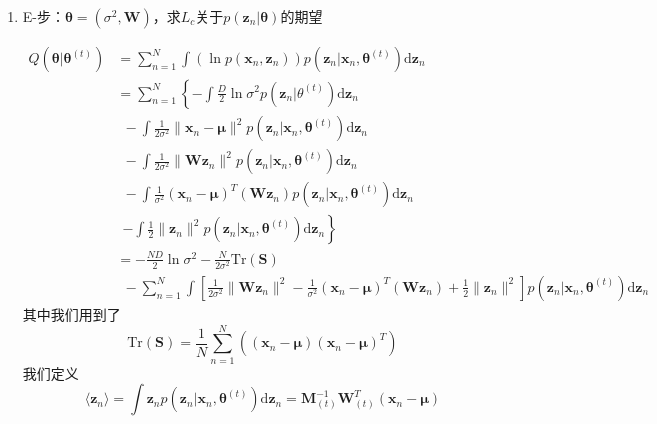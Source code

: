 \begin{enumerate}
	\item E-步：$\boldsymbol{\theta}=(\sigma^2,\boldsymbol{W})$，求$L_c$关于$p(\boldsymbol{z}_n|\boldsymbol{\theta})$的期望
	
	\begin{equation}
		\begin{aligned}
			Q(\boldsymbol{\theta}|\boldsymbol{\theta}^{(t)})&=\sum_{n=1}^{N}\int (\ln p(\boldsymbol{x}_n,\boldsymbol{z}_n))p(\boldsymbol{z}_n|\boldsymbol{x}_n,\boldsymbol{\theta}^{(t)})\mathrm{d}\boldsymbol{z}_n\\
			&=\sum_{n=1}^{N}\left\{-\int \frac{D}{2}\ln \sigma^2p(\boldsymbol{z}_n|\theta^{(t)})\mathrm{d}\boldsymbol{z}_n\right.\\
			&\ \ -\int \frac{1}{2\sigma^2}\lVert \boldsymbol{x}_n-\boldsymbol{\mu}\rVert^2p(\boldsymbol{z}_n|\boldsymbol{x}_n,\boldsymbol{\theta}^{(t)})\mathrm{d}\boldsymbol{z}_n\\
			&\ \ -\int \frac{1}{2\sigma^2}\lVert \boldsymbol{Wz}_n\rVert^2p(\boldsymbol{z}_n|\boldsymbol{x}_n,\boldsymbol{\theta}^{(t)})\mathrm{d}\boldsymbol{z}_n\\
			&\ \ -\int \frac{1}{\sigma^2}(\boldsymbol{x}_n-\boldsymbol{\mu})^T(\boldsymbol{Wz}_n)p(\boldsymbol{z}_n|\boldsymbol{x}_n,\boldsymbol{\theta}^{(t)})\mathrm{d}\boldsymbol{z}_n\\
			&\ \ \left.-\int \frac{1}{2}\lVert \boldsymbol{z}_n\rVert^2p(\boldsymbol{z}_n|\boldsymbol{x}_n,\boldsymbol{\theta}^{(t)})\mathrm{d}\boldsymbol{z}_n\right\}\\
			&=-\frac{ND}{2}\ln \sigma^2-\frac{N}{2\sigma^2}\mathrm{Tr}(\boldsymbol{S})\\
			&\ \ -\sum_{n=1}^{N}\int \left[\frac{1}{2\sigma^2}\lVert\boldsymbol{Wz}_n\rVert^2-\frac{1}{\sigma^2}(\boldsymbol{x}_n-\boldsymbol{\mu})^T(\boldsymbol{Wz}_n)+\frac{1}{2}\lVert\boldsymbol{z}_n\rVert^2 \right]p(\boldsymbol{z}_n|\boldsymbol{x}_n,\boldsymbol{\theta}^{(t)})\mathrm{d}\boldsymbol{z}_n
		\end{aligned}
	\end{equation}
	其中我们用到了
	\begin{equation}
		\mathrm{Tr}(\boldsymbol{S})=\frac{1}{N}\sum_{n=1}^{N}\left((\boldsymbol{x}_n-\boldsymbol{\mu})(\boldsymbol{x}_n-\boldsymbol{\mu})^T\right)
	\end{equation}
	我们定义
	\begin{equation}
		\langle\boldsymbol{z}_n\rangle=\int \boldsymbol{z}_np(\boldsymbol{z}_n|\boldsymbol{x}_n,\boldsymbol{\theta}^{(t)})\mathrm{d}\boldsymbol{z}_n=\boldsymbol{M}^{-1}_{(t)}\boldsymbol{W}_{(t)}^T(\boldsymbol{x}_n-\boldsymbol{\mu})

\end{equation}
\end{enumerate}
